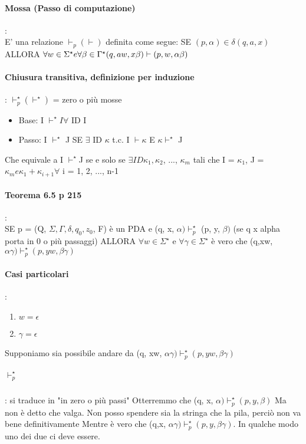 \documentclass[12pt, a4paper, openany, oneside]{book}
\begin{document}
\paragraph{Mossa (Passo di computazione)}:\\
E' una relazione $\vdash_{p} (\vdash)$ definita come segue: SE $(p, \alpha) \in 
\delta (q, a, x)$ ALLORA $\forall w \in \Sigma^{\star} e \forall \beta \in \Gamma^{\star}\\
(q, aw, x\beta) \vdash (p, w, \alpha \beta)$
\paragraph{Chiusura transitiva, definizione per induzione}: 
$\vdash^{\star}_{p}  (\vdash^{\star})$ = zero o più mosse
\begin{itemize}
	\item Base: I $\vdash^{\star} I \forall$ ID I
	\item Passo: I $\vdash^{\star}$ J SE $\exists$ ID $\kappa$ t.c. I $\vdash \kappa$  E
	$\kappa \vdash^{\star}$ J
\end{itemize}
Che equivale a I $\vdash^{\star}$J se e solo se $\exists ID \kappa_{1}, \kappa_{2}$,
..., $\kappa_{m}$ tali che I = $\kappa_{1}$, J = $\kappa_{m} e \kappa_{1} + \kappa_{i+1} 
\forall$ i = 1, 2, ..., n-1
\paragraph{Teorema 6.5 p 215}:\\
SE p = (Q, $\Sigma, \Gamma, \delta, q_{0}, z_{0}$, F) è un PDA e (q, x, $\alpha) \vdash^{\star}_{p}$
(p, y,  $\beta)$ (se q x alpha porta in 0 o più passaggi) ALLORA $\forall w \in \Sigma^{\star}$
e $\forall \gamma \in \Sigma^{\star}$ è vero che (q,xw, $\alpha\gamma) \vdash^{\star}_{p}
(p, yw, \beta\gamma)$
\paragraph{Casi particolari}:\\
\begin{enumerate}
	\item $w = \epsilon$
	\item $\gamma = \epsilon$
\end{enumerate}
Supponiamo sia possibile andare da (q, xw, $\alpha\gamma) \vdash^{\star}_{p} (p, yw, \beta\gamma)$
\subparagraph{$\vdash^{\star}_{p}$}: si traduce in "in zero o più passi"
Otterremmo che (q, x, $\alpha) \vdash^{\star}_{p} (p, y, \beta)$ Ma non è detto 
che valga. Non posso spendere sia la stringa che la pila, perciò non va bene 
definitivamente Mentre è vero che (q,x, $\alpha\gamma) \vdash^{\star}_{p}
(p, y, \beta\gamma)$. In qualche modo uno dei due ci deve essere. 
\end{document}
